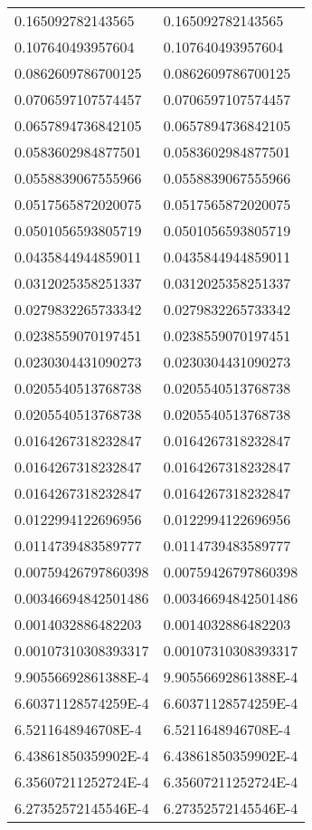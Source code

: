 \documentclass[12pt]{article}
\begin{document}
\begin{tabular}{l l}0.165092782143565	&	0.165092782143565\\
0.107640493957604	&	0.107640493957604\\
0.0862609786700125	&	0.0862609786700125\\
0.0706597107574457	&	0.0706597107574457\\
0.0657894736842105	&	0.0657894736842105\\
0.0583602984877501	&	0.0583602984877501\\
0.0558839067555966	&	0.0558839067555966\\
0.0517565872020075	&	0.0517565872020075\\
0.0501056593805719	&	0.0501056593805719\\
0.0435844944859011	&	0.0435844944859011\\
0.0312025358251337	&	0.0312025358251337\\
0.0279832265733342	&	0.0279832265733342\\
0.0238559070197451	&	0.0238559070197451\\
0.0230304431090273	&	0.0230304431090273\\
0.0205540513768738	&	0.0205540513768738\\
0.0205540513768738	&	0.0205540513768738\\
0.0164267318232847	&	0.0164267318232847\\
0.0164267318232847	&	0.0164267318232847\\
0.0164267318232847	&	0.0164267318232847\\
0.0122994122696956	&	0.0122994122696956\\
0.0114739483589777	&	0.0114739483589777\\
0.00759426797860398	&	0.00759426797860398\\
0.00346694842501486	&	0.00346694842501486\\
0.0014032886482203	&	0.0014032886482203\\
0.00107310308393317	&	0.00107310308393317\\
9.90556692861388E-4	&	9.90556692861388E-4\\
6.60371128574259E-4	&	6.60371128574259E-4\\
6.5211648946708E-4	&	6.5211648946708E-4\\
6.43861850359902E-4	&	6.43861850359902E-4\\
6.35607211252724E-4	&	6.35607211252724E-4\\
6.27352572145546E-4	&	6.27352572145546E-4\\

\end{tabular}
\end{document}
